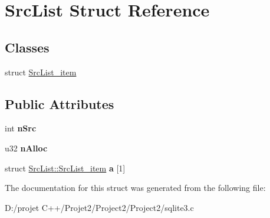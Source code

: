 \hypertarget{struct_src_list}{}\section{Src\+List Struct Reference}
\label{struct_src_list}
\subsection*{Classes}
\begin{DoxyCompactItemize}
\item 
struct \mbox{\hyperlink{struct_src_list_1_1_src_list__item}{Src\+List\+\_\+item}}
\end{DoxyCompactItemize}
\subsection*{Public Attributes}
\begin{DoxyCompactItemize}
\item 
\mbox{\label{struct_src_list_a8ecf9cced910877d93210ace66365ec8}} 
int {\bfseries n\+Src}
\item 
\mbox{\label{struct_src_list_ab9c572bef9144ab245f7f46bc5b82a61}} 
u32 {\bfseries n\+Alloc}
\item 
\mbox{\label{struct_src_list_acd181938f7144b40022b28072247aa3d}} 
struct \mbox{\hyperlink{struct_src_list_1_1_src_list__item}{Src\+List\+::\+Src\+List\+\_\+item}} {\bfseries a} \mbox{[}1\mbox{]}
\end{DoxyCompactItemize}


The documentation for this struct was generated from the following file\+:\begin{DoxyCompactItemize}
\item 
D\+:/projet C++/\+Projet2/\+Project2/\+Project2/sqlite3.\+c\end{DoxyCompactItemize}
